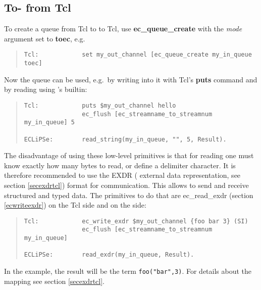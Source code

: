 \subsection{To-{\eclipse} from Tcl}
To create a queue from Tcl to {\eclipse} to Tcl, use {\bf ec_queue_create} with
the {\it mode\/} argument set to {\bf toec}, e.g.\
\begin{quote}\begin{verbatim}
Tcl:            set my_out_channel [ec_queue_create my_in_queue toec]
\end{verbatim}\end{quote}
Now the queue can be used, e.g.\ by writing into it with Tcl's {\bf puts}
command and by reading using {\eclipse}'s
builtin:
\begin{quote}\begin{verbatim}
Tcl:            puts $my_out_channel hello
                ec_flush [ec_streamname_to_streamnum my_in_queue] 5

ECLiPSe:        read_string(my_in_queue, "", 5, Result).
\end{verbatim}\end{quote}
The disadvantage of using these low-level primitives is that
for reading one must know exactly how many bytes to read, or define
a delimiter character.
It is therefore recommended to use the EXDR ({\eclipse} external data
representation, see section \ref{secexdrtcl}) format for communication.
This allows to send and receive structured and typed data.
The primitives to do that are
ec_read_exdr (section \ref{ecwriteexdr}) on the Tcl side and
on the {\eclipse} side:
\begin{quote}\begin{verbatim}
Tcl:            ec_write_exdr $my_out_channel {foo bar 3} (SI)
                ec_flush [ec_streamname_to_streamnum my_in_queue]

ECLiPSe:        read_exdr(my_in_queue, Result).
\end{verbatim}\end{quote}
In the example, the {\eclipse} result will be the term {\tt foo("bar",3)}.
For details about the mapping see section \ref{secexdrtcl}.


